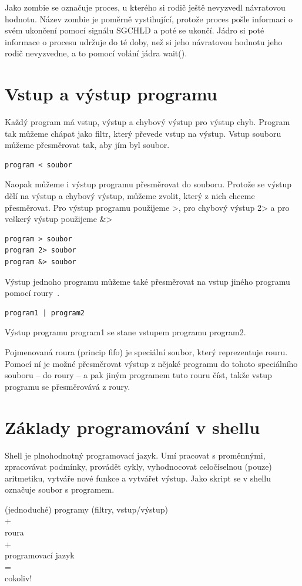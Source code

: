 \documentclass{article}
\begin{document}
Jako zombie se označuje proces, u kterého si rodič ještě nevyzvedl návratovou hodnotu. Název zombie je poměrně vystihující, protože proces pošle informaci o svém ukončení pomocí signálu SGCHLD a poté se ukončí. Jádro si poté informace o procesu udržuje do té doby, než si jeho návratovou hodnotu jeho rodič nevyzvedne, a to pomocí volání jádra wait().

\section{Vstup a výstup programu}
Každý program má vstup, výstup a chybový výstup pro výstup chyb. Program tak můžeme chápat jako filtr, který převede vstup na výstup. Vstup souboru můžeme přesměrovat tak, aby jím byl soubor.
\begin{verbatim}
program < soubor
\end{verbatim}

Naopak můžeme i výstup programu přesměrovat do souboru. Protože se výstup dělí na výstup a chybový výstup, můžeme zvolit, který z nich chceme přesměrovat. Pro výstup programu použijeme \textgreater, pro chybový výstup 2\textgreater{} a pro veškerý výstup použijeme \&\textgreater
\begin{verbatim}
program > soubor
program 2> soubor
program &> soubor
\end{verbatim}

Výstup jednoho programu můžeme také přesměrovat na vstup jiného programu pomocí roury~\textpipe. 
\begin{verbatim}
program1 | program2
\end{verbatim} 
Výstup programu program1 se stane vstupem programu program2.

Pojmenovaná roura (princip fifo) je speciální soubor, který reprezentuje rouru. Pomocí ní je možné přesměrovat výstup z nějaké programu do tohoto speciálního souboru -- do roury -- a pak jiným programem tuto rouru číst, takže vstup programu se přesměrovává z roury.

\section{Základy programování v shellu}
Shell je plnohodnotný programovací jazyk. Umí pracovat s proměnnými, zpracovávat podmínky, provádět cykly, vyhodnocovat celočíselnou (pouze) aritmetiku, vytváře nové funkce a vytvářet výstup. Jako skript se v shellu označuje soubor s programem.

\begin{center}
(jednoduché) programy (filtry, vstup/výstup)\\
+\\
roura\\
+\\
programovací jazyk\\
=\\
cokoliv!
\end{center}
\begin{flushright}
\cite{outrataSlides}
\end{flushright}
\end{document}
